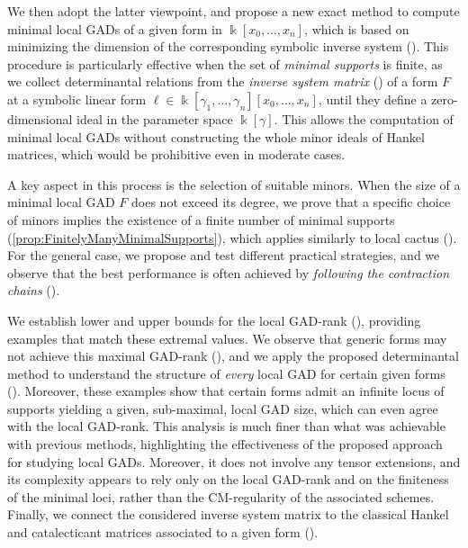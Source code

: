 \documentclass{amsart}
\theoremstyle{plain}
\renewcommand{\k}{\Bbbk}
\def\c{\gamma}
\numberwithin{equation}{section}
\begin{document}
We then adopt the latter viewpoint, and propose a new exact method to compute minimal local GADs of a given form in $\k[x_0, \dots,x_n]$, which is based on minimizing the dimension of the corresponding symbolic inverse system ().
This procedure is particularly effective when the set of \emph{minimal supports} is finite, as we collect determinantal relations from the \emph{inverse system matrix} () of a form $F$ at a symbolic linear form $\ell \in \k[\c_1, \dots,\c_n][x_0, \dots, x_n]$, until they define a zero-dimensional ideal in the parameter space $\k[\c]$.
This allows the computation of minimal local GADs without constructing the whole minor ideals of Hankel matrices, which would be prohibitive even in moderate cases.

A key aspect in this process is the selection of suitable minors.
When the size of a minimal local GAD $F$ does not exceed its degree, we prove that a specific choice of minors implies the existence of a finite number of minimal supports (\cref{prop:FinitelyManyMinimalSupports}), which applies similarly to local cactus ().
For the general case, we propose and test different practical strategies, and we observe that the best performance is often achieved by \emph{following the contraction chains} ().

We establish lower and upper bounds for the local GAD-rank (), providing examples that match these extremal values.
We observe that generic forms may not achieve this maximal GAD-rank (), and we apply the proposed determinantal method to understand the structure of \emph{every} local GAD for certain given forms ().
Moreover, these examples show that certain forms admit an infinite locus of supports yielding a given, sub-maximal, local GAD size, which can even agree with the local GAD-rank.
This analysis is much finer than what was achievable with previous methods, highlighting the effectiveness of the proposed approach for studying local GADs.
Moreover, it does not involve any tensor extensions, and its complexity appears to rely only on the local GAD-rank and on the finiteness of the minimal loci, rather than the CM-regularity of the associated schemes.
Finally, we connect the considered inverse system matrix to the classical Hankel and catalecticant matrices associated to a given form ().
\end{document}

